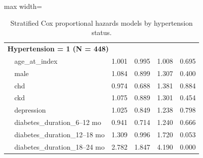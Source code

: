 \documentclass[twoside,11pt]{article}
\begin{document}
\begin{table}[H]
\begin{adjustbox}{max width=\textwidth}
\begin{tabular}{llcccc}
      \multicolumn{6}{l}{\textbf{Hypertension = 1 (N = 448)}}                                                                           \\
                       & age\_at\_index                & 1.001       & 0.995           & 1.008            & 0.695                       \\
                       & male                          & 1.084       & 0.899           & 1.307            & 0.400                       \\
                       & chd                           & 0.974       & 0.688           & 1.381            & 0.884                       \\
                       & ckd                           & 1.075       & 0.889           & 1.301            & 0.454                       \\
                       & depression                    & 1.025       & 0.849           & 1.238            & 0.798                       \\
                       & diabetes\_duration\_6--12 mo  & 0.941       & 0.714           & 1.240            & 0.666                       \\
                       & diabetes\_duration\_12--18 mo & 1.309       & 0.996           & 1.720            & 0.053                       \\
                       & diabetes\_duration\_18--24 mo & 2.782       & 1.847           & 4.190            & \cellcolor{lightgreen}0.000 \\

      \hline
    \end{tabular}
  \end{adjustbox}
  \caption{Stratified Cox proportional hazards models by hypertension status.}
  \label{tab:hypertension_stratified}
\end{table}
\end{document}
